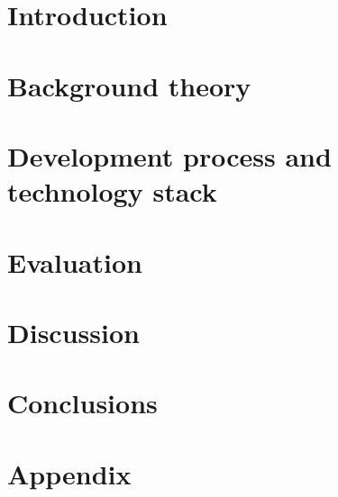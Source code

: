 \documentclass[nofilelist,dvipsnames]{cslthse-msc}
\begin{document}



\tableofcontents

\chapter{Introduction}

  

\chapter{Background theory}

  

\chapter{Development process and technology stack}

  

\chapter{Evaluation}

  

\chapter{Discussion}

  

\chapter{Conclusions}

  

%
%  


\chapter{Appendix}

  
\end{document}

